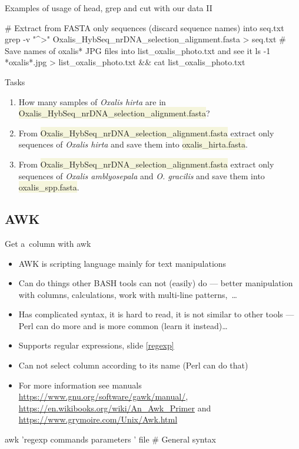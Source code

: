 \documentclass[compress, xelatex, 11pt, xcolor=svgnames, aspectratio=169,
	hyperref={
		bookmarks=true,
		unicode=true,
		colorlinks=true,
		pdftitle={Linux, command line and MetaCentrum},
		plainpages=false,
		pdfauthor={Vojtech Zeisek},
		pdfsubject={Course about use of Linux command line, writing shell scripts and using MetaCentrum of CESNET},
		pdfcreator={XeLaTeX},
		pdfkeywords={Linux, GNU, BASH, shell, command line, MetaCentrum},
		linkcolor=DarkRed, %
		anchorcolor=DarkBlue, %
		citecolor=Indigo, %
		filecolor=NavyBlue, %
		menucolor=DarkMagenta, %
		urlcolor=DarkBlue, %
		},
	url={hyphens, lowtilde} %
	]{beamer}
\renewcommand{\texttt}[1]{\colorbox{Beige}{{\ttfamily #1}}}
\begin{document}
\begin{frame}[fragile]{Examples of usage of head, grep and cut with our data II}
	\begin{bashcode}
    # Extract from FASTA only sequences (discard sequence names) into seq.txt
    grep -v "^>" Oxalis_HybSeq_nrDNA_selection_alignment.fasta > seq.txt
    # Save names of oxalis* JPG files into list_oxalis_photo.txt and see it
    ls -1 *oxalis*.jpg > list_oxalis_photo.txt && cat list_oxalis_photo.txt
	\end{bashcode}
	\begin{block}{Tasks}
		\begin{enumerate}
			\item How many samples of \textit{Oxalis hirta} are in \texttt{Oxalis\_HybSeq\_nrDNA\_selection\_alignment.fasta}?
			\item From \texttt{Oxalis\_HybSeq\_nrDNA\_selection\_alignment.fasta} extract only sequences of \textit{Oxalis hirta} and save them into \texttt{oxalis\_hirta.fasta}.
			\item From \texttt{Oxalis\_HybSeq\_nrDNA\_selection\_alignment.fasta} extract only sequences of \textit{Oxalis amblyosepala} and \textit{O. gracilis} and save them into \texttt{oxalis\_spp.fasta}.
		\end{enumerate}
	\end{block}
\end{frame}

\subsection{AWK}

\begin{frame}[fragile]{Get a~column with awk}
	\begin{itemize}
		\item AWK is scripting language mainly for text manipulations
		\item Can do things other BASH tools can not (easily) do --- better manipulation with columns, calculations, work with multi-line patterns,~\ldots
		\item Has complicated syntax, it is hard to read, it is not similar to other tools --- Perl can do more and is more common (learn it instead)\ldots
		\item Supports regular expressions, slide \ref{regexp}
		\item Can not select column according to its name (Perl can do that)
		\item For more information see manuals \url{https://www.gnu.org/software/gawk/manual/}, \url{https://en.wikibooks.org/wiki/An_Awk_Primer} and \url{https://www.grymoire.com/Unix/Awk.html}
	\end{itemize}
	\vfill
	\begin{bashcode}
    awk 'regexp { commands parameters }' file # General syntax
	\end{bashcode}
\end{frame}
\end{document}
